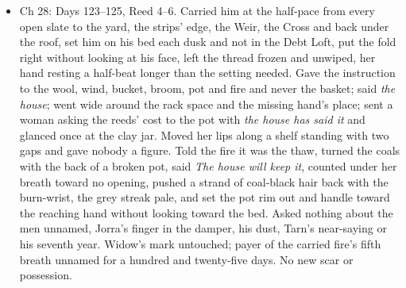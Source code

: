 \documentclass{design/chronicle}
\begin{document}
{\begin{itemize}[leftmargin=1.4em,itemsep=1pt,topsep=3pt,parsep=0pt]
\end{itemize}

\begin{itemize}[leftmargin=1.4em,itemsep=1pt,topsep=3pt,parsep=0pt]

\item Ch 28: Days 123–125, Reed 4–6. Carried him at the half-pace from every open slate to the yard, the strips’ edge, the Weir, the Cross and back under the roof, set him on his bed each dusk and not in the Debt Loft, put the fold right without looking at his face, left the thread frozen and unwiped, her hand resting a half-beat longer than the setting needed. Gave the instruction to the wool, wind, bucket, broom, pot and fire and never the basket; said \emph{the house}; went wide around the rack space and the missing hand’s place; sent a woman asking the reeds’ cost to the pot with \emph{the house has said it} and glanced once at the clay jar. Moved her lips along a shelf standing with two gaps and gave nobody a figure. Told the fire it was the thaw, turned the coals with the back of a broken pot, said \emph{The house will keep it}, counted under her breath toward no opening, pushed a strand of coal-black hair back with the burn-wrist, the grey streak pale, and set the pot rim out and handle toward the reaching hand without looking toward the bed. Asked nothing about the men unnamed, Jorra’s finger in the damper, his dust, Tarn’s near-saying or his seventh year. Widow’s mark untouched; payer of the carried fire’s fifth breath unnamed for a hundred and twenty-five days. No new scar or possession.

\end{itemize}

\begin{itemize}[leftmargin=1.4em,itemsep=1pt,topsep=3pt,parsep=0pt]


\end{itemize}}
\end{document}
